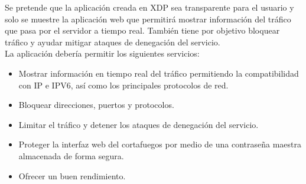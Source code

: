 Se pretende que la aplicación creada en XDP sea transparente para el usuario y solo se muestre la aplicación web que permitirá mostrar información del tráfico que pasa por el servidor a tiempo real. También tiene por objetivo bloquear tráfico y ayudar mitigar ataques de denegación del servicio.
\\La aplicación debería permitir los siguientes servicios:
\begin{itemize}
        \item Mostrar información en tiempo real del tráfico permitiendo la compatibilidad con IP e IPV6, así como los principales protocolos de red.
        \item Bloquear direcciones, puertos y protocolos.
        \item Limitar el tráfico y detener los ataques de denegación del servicio.
        \item Proteger la interfaz web del cortafuegos por medio de una contraseña maestra almacenada de forma segura.
        \item Ofrecer un buen rendimiento.
\end{itemize}